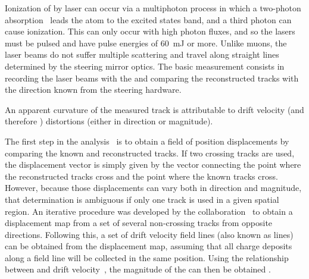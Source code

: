 Ionization of  by laser can occur via a multiphoton process in which a two-photon absorption~\cite{Badhrees:2010zz} leads the atom to the excited states band, and a third photon can cause ionization. This can only occur with high photon fluxes, and so the lasers must be pulsed and have pulse energies of \SI{60}{\milli\joule} or more. Unlike muons, the laser beams do not suffer multiple scattering and travel along straight lines determined by the steering mirror optics. The basic measurement consists in recording the laser beams with the  and comparing the reconstructed tracks with the direction known from the steering hardware. 

An apparent curvature of the measured track is attributable to drift velocity (and therefore \efield) distortions (either in direction or magnitude).

The first step in the analysis~\cite{bib:uBlaser2019} is to obtain a field of position displacements by comparing the known and reconstructed tracks. If two crossing tracks are used, the displacement vector is simply given by the vector connecting the point where the reconstructed tracks cross and the point where the known tracks cross. However, because those displacements can vary both in direction and magnitude, that determination is ambiguous if only one track is used in a given spatial region. An iterative procedure was developed by the  collaboration~\cite{bib:chen2018,bib:uBlaser2019} to 
obtain a displacement map from a set of several non-crossing tracks from opposite directions. Following this, a set of drift velocity field lines (also known as \efield lines) can be obtained from the displacement map, assuming that all charge deposits along a field line will be collected in the same position. Using the relationship between \efield and drift velocity~\cite{Li:2015rqa,Walkowiak:2000wf}, the magnitude of the \efield can then be obtained 
.



